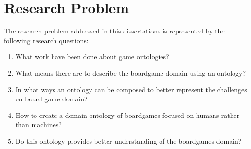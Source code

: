 \section{Research Problem}

The research problem addressed in this dissertations is represented by the following research questions:
\begin{enumerate}
    \item {What work have been done about game ontologies?}
    \item {What means there are to describe the boardgame domain using an ontology?}
    \item {In what ways an ontology can be composed to better represent the challenges on board game domain?}
    \item {How to create a domain ontology of boardgames focused on humans rather than machines?}
    \item{Do this ontology provides better understanding of the boardgames domain?}
\end{enumerate}